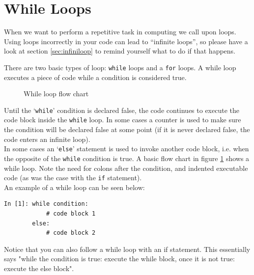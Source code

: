 \section{While Loops}
When we want to perform a repetitive task in computing we call upon loops. Using loops incorrectly in your code can lead to ``infinite loops'', so please have a look at section \ref{sec:infiniloop} to remind yourself what to do if that happens.

There are two basic types of loop: {\tt while} loops and a {\tt for} loops. A while loop executes a piece of code while a condition is considered true.

\begin{figure}[h]
\begin{center}
\end{center}
\caption{While loop flow chart}
\label{fig:wlfc}
\end{figure}
\vspace{1cm}
\noindent Until the `{\tt while}' condition is declared false, the code continues to execute the code block inside the \texttt{while} loop. In some cases a counter is used to make sure the condition will be declared false at some point (if it is never declared false, the code enters an infinite loop).  \\
\noindent In some cases an `{\tt else}' statement is used to invoke another code block, i.e. when the opposite of the {\tt while} condition is true. A basic flow chart in figure \ref{fig:wlfc} shows a while loop. Note the need for colons after the condition, and indented executable code (as was the case with the {\tt if} statement). \\

\noindent An example of a while loop can be seen below:
\begin{lstlisting}[style=PY]
In [1]: while condition:
            # code block 1
        else:
            # code block 2
\end{lstlisting}
Notice that you can also follow a while loop with an if statement. This essentially says "while the condition is true: execute the while block, once it is not true: execute the else block". \\


